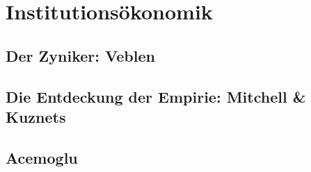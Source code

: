 %
%
%

\chapter{Institutionsökonomik}
\label{Institut}


\section{Der Zyniker: Veblen}

\section{Die Entdeckung der Empirie: Mitchell \& Kuznets}

\section{Acemoglu}





